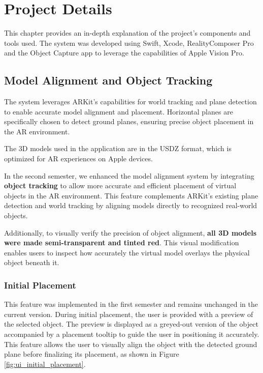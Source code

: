 \chapter{Project Details}

This chapter provides an in-depth explanation of the project's components and tools used. The system was developed using Swift, Xcode, RealityComposer Pro and the Object Capture app to leverage the capabilities of Apple Vision Pro.



\section{Model Alignment and Object Tracking}

The system leverages ARKit’s capabilities for world tracking and plane detection to enable accurate model alignment and placement. Horizontal planes are specifically chosen to detect ground planes, ensuring precise object placement in the AR environment.

The 3D models used in the application are in the USDZ format, which is optimized for AR experiences on Apple devices.

In the second semester, we enhanced the model alignment system by integrating \textbf{object tracking} to allow more accurate and efficient placement of virtual objects in the AR environment. This feature complements ARKit’s existing plane detection and world tracking by aligning models directly to recognized real-world objects.

Additionally, to visually verify the precision of object alignment, \textbf{all 3D models were made semi-transparent and tinted red}. This visual modification enables users to inspect how accurately the virtual model overlays the physical object beneath it.


\subsection{Initial Placement}
This feature was implemented in the first semester and remains unchanged in the current version. During initial placement, the user is provided with a preview of the selected object. The preview is displayed as a greyed-out version of the object accompanied by a placement tooltip to guide the user in positioning it accurately. This feature allows the user to visually align the object with the detected ground plane before finalizing its placement, as shown in Figure \ref{fig:ui_initial_placement}.

